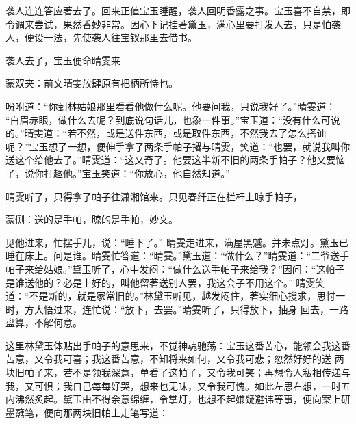 \begin{parag}
    袭人连连答应著去了。回来正值宝玉睡醒，袭人回明香露之事。宝玉喜不自禁，即令调来尝试，果然香妙非常。因心下记挂著黛玉，满心里要打发人去，只是怕袭人，便设一法，先使袭人往宝钗那里去借书。
\end{parag}


\begin{parag}
    袭人去了，宝玉便命晴雯来\begin{note}蒙双夹：前文晴雯放肆原有把柄所恃也。\end{note}吩咐道：“你到林姑娘那里看看他做什么呢。他要问我，只说我好了。”晴雯道： “白眉赤眼，做什么去呢？到底说句话儿，也象一件事。”宝玉道：“没有什么可说的。”晴雯道：“若不然，或是送件东西，或是取件东西，不然我去了怎么搭讪 呢？”宝玉想了一想，便伸手拿了两条手帕子撂与晴雯，笑道：“也罢，就说我叫你送这个给他去了。”晴雯道：“这又奇了。他要这半新不旧的两条手帕子？他又要恼了，说你打趣他。”宝玉笑道：“你放心，他自然知道。”
\end{parag}


\begin{parag}
    晴雯听了，只得拿了帕子往潇湘馆来。只见春纤正在栏杆上晾手帕子，\begin{note}蒙侧：送的是手帕，晾的是手帕，妙文。\end{note}见他进来，忙摆手儿，说：“睡下了。” 晴雯走进来，满屋黑魆。并未点灯。黛玉已睡在床上。问是谁。晴雯忙答道：“晴雯。”黛玉道：“做什么？”晴雯道：“二爷送手帕子来给姑娘。”黛玉听了，心中发闷：“做什么送手帕子来给我？”因问：“这帕子是谁送他的？必是上好的，叫他留著送别人罢，我这会子不用这个。” 晴雯笑道：“不是新的，就是家常旧的。”林黛玉听见，越发闷住，著实细心搜求，思忖一时，方大悟过来，连忙说：“放下，去罢。”晴雯听了，只得放下，抽身 回去，一路盘算，不解何意。
\end{parag}


\begin{parag}
    这里林黛玉体贴出手帕子的意思来，不觉神魂驰荡：宝玉这番苦心，能领会我这番苦意，又令我可喜；我这番苦意，不知将来如何，又令我可悲；忽然好好的送 两块旧帕子来，若不是领我深意，单看了这帕子，又令我可笑；再想令人私相传递与我，又可惧；我自己每每好哭，想来也无味，又令我可愧。如此左思右想，一时五内沸然炙起。黛玉由不得余意绵缠，令掌灯，也想不起嫌疑避讳等事，便向案上研墨蘸笔，便向那两块旧帕上走笔写道：
\end{parag}


